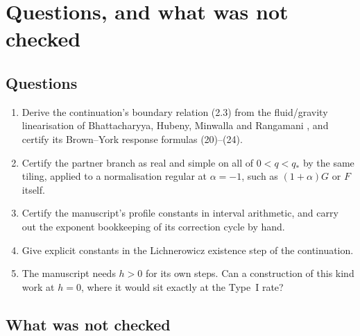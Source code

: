 \section{Questions, and what was not checked}\label{sec:open}

\subsection{Questions}

\begin{enumerate}[label=\arabic*.,ref=\arabic*]
\item\label{q:bhmr} Derive the continuation's boundary relation (2.3) from the fluid/gravity linearisation of Bhattacharyya, Hubeny, Minwalla and Rangamani \cite{BHMR}, and certify its Brown--York response formulas (20)--(24).
\item\label{q:partner} Certify the partner branch as real and simple on all of $0<q<q_*$ by the same tiling, applied to a normalisation regular at $\alpha=-1$, such as $(1+\alpha)G$ or $F$ itself.
\item\label{q:profiles} Certify the manuscript's profile constants in interval arithmetic, and carry out the exponent bookkeeping of its correction cycle by hand.
\item\label{q:lichnerowicz} Give explicit constants in the Lichnerowicz existence step of the continuation.
\item\label{q:hzero} The manuscript needs $h>0$ for its own steps. Can a construction of this kind work at $h=0$, where it would sit exactly at the Type~I rate?
\end{enumerate}

\subsection{What was not checked}

